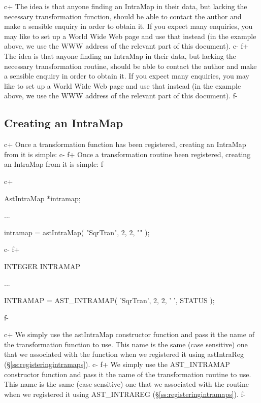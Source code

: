 \documentclass[twoside,11pt]{starlink}
\providecommand{\secref}[1]{\S\ref{#1}}
\begin{document}
c+
The idea is that anyone finding an IntraMap in their data, but lacking
the necessary transformation function, should be able to contact the
author and make a sensible enquiry in order to obtain it. If you
expect many enquiries, you may like to set up a World Wide Web page
and use that instead (in the example above, we use the WWW address of
the relevant part of this document).
c-
f+
The idea is that anyone finding an IntraMap in their data, but lacking
the necessary transformation routine, should be able to contact the
author and make a sensible enquiry in order to obtain it. If you
expect many enquiries, you may like to set up a World Wide Web page
and use that instead (in the example above, we use the WWW address of
the relevant part of this document).
f-

\subsection{Creating an IntraMap}

c+
Once a transformation function has been registered, creating an
IntraMap from it is simple:
c-
f+
Once a transformation routine been registered, creating an IntraMap
from it is simple:
f-

c+
\small
\begin{terminalv}
AstIntraMap *intramap;

...

intramap = astIntraMap( "SqrTran", 2, 2, "" );
\end{terminalv}
\normalsize
c-
f+
\small
\begin{terminalv}
      INTEGER INTRAMAP

      ...

      INTRAMAP = AST_INTRAMAP( 'SqrTran', 2, 2, ' ', STATUS );
\end{terminalv}
\normalsize
f-

c+
We simply use the astIntraMap constructor function and pass it the
name of the transformation function to use. This name is the same
(case sensitive) one that we associated with the function when we
registered it using astIntraReg (\secref{ss:registeringintramaps}).
c-
f+
We simply use the AST\_INTRAMAP constructor function and pass it the
name of the transformation routine to use. This name is the same (case
sensitive) one that we associated with the routine when we registered
it using AST\_INTRAREG (\secref{ss:registeringintramaps}).
f-
\end{document}
